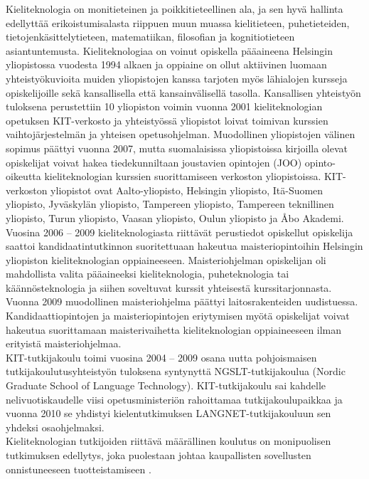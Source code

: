 \begin{multicols}{2}
Kieliteknologia on monitieteinen ja poikkitieteellinen ala, ja sen
hyvä hallinta edellyttää erikoistumisalasta riippuen muun muassa
kielitieteen, puhetieteiden, tietojenkäsittelytieteen, matematiikan,
filosofian ja kognitiotieteen asiantuntemusta. Kieliteknologiaa on
voinut opiskella pääaineena Helsingin yliopistossa vuodesta 1994
alkaen ja oppiaine on ollut aktiivinen luomaan yhteistyökuvioita
muiden yliopistojen kanssa tarjoten myös lähialojen kursseja
opiskelijoille sekä kansallisella että kansainvälisellä
tasolla. Kansallisen yhteistyön tuloksena perustettiin 10 yliopiston
voimin vuonna 2001 kieliteknologian opetuksen KIT-verkosto ja
yhteistyössä yliopistot loivat toimivan kurssien vaihtojärjestelmän ja
yhteisen opetusohjelman.  Muodollinen yliopistojen välinen sopimus
päättyi vuonna 2007, mutta suomalaisissa yliopistoissa kirjoilla
olevat opiskelijat voivat hakea tiedekunniltaan joustavien opintojen
(JOO) opinto-oikeutta kieliteknologian kurssien suorittamiseen
verkoston yliopistoissa. KIT-verkoston yliopistot ovat
Aalto-yliopisto, Helsingin yliopisto, Itä-Suomen yliopisto, Jyväskylän yliopisto, 
Tampereen yliopisto, Tampereen teknillinen yliopisto, Turun yliopisto, Vaasan
yliopisto, Oulun yliopisto ja Åbo Akademi.\\
Vuosina 2006 – 2009 kieliteknologiasta riittävät perustiedot
opiskellut opiskelija saattoi kandidaatintutkinnon suoritettuaan
hakeutua maisteriopintoihin Helsingin yliopiston kieliteknologian
oppiaineeseen.  Maisteriohjelman opiskelijan oli mahdollista valita pääaineeksi
kieliteknologia, puheteknologia tai käännösteknologia ja siihen soveltuvat kurssit yhteisestä 
kurssitarjonnasta. Vuonna 2009 muodollinen maisteriohjelma
päättyi laitosrakenteiden uudistuessa.  Kandidaattiopintojen ja
maisteriopintojen eriytymisen myötä opiskelijat voivat hakeutua
suorittamaan maisterivaihetta kieliteknologian oppiaineeseen ilman
erityistä maisteriohjelmaa.\\
KIT-tutkijakoulu toimi vuosina 2004 -- 2009 osana uutta pohjoismaisen
tutkijakoulutusyhteistyön tuloksena syntynyttä NGSLT-tutkijakoulua
(Nordic Graduate School of Language Technology). KIT-tutkijakoulu sai kahdelle
nelivuotiskaudelle viisi opetusministeriön rahoittamaa
tutkijakoulupaikkaa ja vuonna 2010 se yhdistyi kielentutkimuksen
LANGNET-tutkijakouluun sen yhdeksi osaohjelmaksi.\\
Kieliteknologian tutkijoiden riittävä määrällinen koulutus on
monipuolisen tutkimuksen edellytys, joka puolestaan johtaa
kaupallisten sovellusten onnistuneeseen tuotteistamiseen \cite{FinExp}.



\end{multicols}
